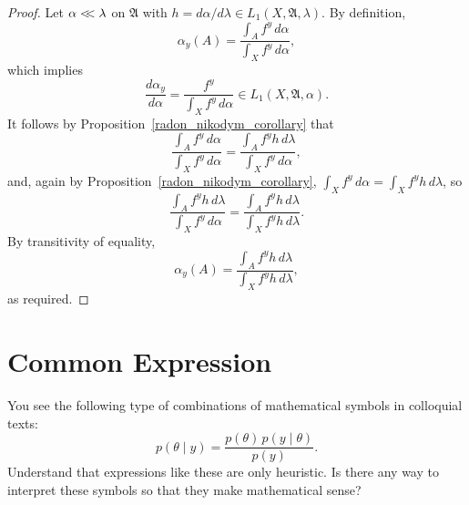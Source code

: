 \documentclass[
twoside=true,
paper=letter,
fontsize=11pt,
pagesize=auto,
leqno,
openany,
headsepline,
overfullrule,
]{scrbook}
\theoremstyle{plain}
\theoremstyle{plain}
\theoremstyle{definition}
\theoremstyle{bfnoteitalic}
\theoremstyle{bfnoteroman}
\newcommand{\sigalg}[1]{\mathfrak{#1}}
\newcommand{\funcf}{f}
\newcommand{\funch}{h}
\newcommand{\function}{f}
\newcommand{\functioniii}{h}
\newcommand{\measurespace}{X}
\newcommand{\abscont}{\mathrel{< \kern-3.5pt <}}
\newcommand{\measlambda}{\lambda}
\newcommand{\pspace}{\measurespace}%
\newcommand{\pspaceset}{A}
\newcommand{\sspaceelt}{y}
\newcommand{\pspacesig}{\sigalg{A}}
\newcommand{\marginalone}{\alpha}%
\newcommand{\prior}{\marginalone}
\begin{document}
\begin{proof}
Let
$\prior\abscont\measlambda$ on $\pspacesig$ with
$\funch
= d\prior/d\measlambda
\in L_1(\pspace, \pspacesig, \measlambda)$.
By definition,
\[
\prior_\sspaceelt(\pspaceset) =
\frac{\int_\pspaceset \function^\sspaceelt \, d\prior}
{\int_\pspace \function^\sspaceelt \, d\prior},
\]
which implies
\[
\frac{d\prior_\sspaceelt}{d\prior}
=
\frac{\funcf^\sspaceelt}
{\int_\pspace \function^\sspaceelt \, d\prior}
\in L_1(\pspace, \pspacesig, \prior).
\]
It follows by Proposition~\ref{radon_nikodym_corollary} that
\[
\frac{\int_\pspaceset \function^\sspaceelt \, d\prior}
{\int_\pspace \function^\sspaceelt \, d\prior}
=
\frac{\int_\pspaceset\function^\sspaceelt\functioniii\,d\measlambda}
{\int_\pspace\function^\sspaceelt\,d\prior},
\]
and, again by Proposition~\ref{radon_nikodym_corollary},
$\int_\pspace\function^\sspaceelt\,d\prior
=
\int_\pspace\function^\sspaceelt\functioniii\,d\measlambda$,
so
\[
\frac{\int_\pspaceset\function^\sspaceelt\functioniii\,d\measlambda}
{\int_\pspace\function^\sspaceelt\,d\prior}
=
\frac{\int_\pspaceset\function^\sspaceelt\functioniii\,d\measlambda}
{\int_\pspace\function^\sspaceelt\functioniii\,d\measlambda}.
\]
By transitivity of equality,
\[
\prior_\sspaceelt(\pspaceset)
=
\frac{\int_\pspaceset\function^\sspaceelt\functioniii\,d\measlambda}
{\int_\pspace\function^\sspaceelt\functioniii\,d\measlambda},
\]
as required.
\end{proof}





\section{Common Expression}\label{common_expression}
You see the following type of combinations of mathematical symbols in colloquial texts:
\begin{equation}\label{quaint}
p(\theta \mid y)
=
\frac{p(\theta) \, p(y \mid \theta)}
{p(y)}.
\end{equation}
Understand that expressions like these are only heuristic.
Is there any way to interpret these symbols so that they make mathematical sense?
\end{document}

